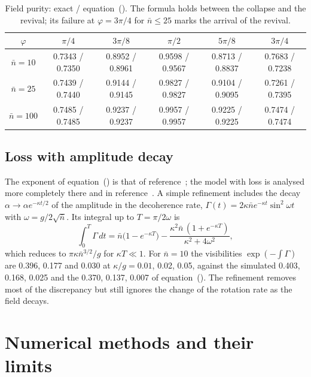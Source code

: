 \documentclass{iopjournal}
\newcommand{\nbar}{\bar{n}}
\begin{document}
\begin{table}
\centering
\caption{Field purity: exact / equation~(). The formula holds between the collapse and the revival; its failure at $\varphi = 3\pi/4$ for $\nbar\leq25$ marks the arrival of the revival.}
\begin{tabular}{cccccc}
\hline
$\varphi$ & $\pi/4$ & $3\pi/8$ & $\pi/2$ & $5\pi/8$ & $3\pi/4$ \\
\hline
$\nbar = 10$ & 0.7343 / 0.7350 & 0.8952 / 0.8961 & 0.9598 / 0.9567 & 0.8713 / 0.8837 & 0.7683 / 0.7238 \\
$\nbar = 25$ & 0.7439 / 0.7440 & 0.9144 / 0.9145 & 0.9827 / 0.9827 & 0.9104 / 0.9095 & 0.7261 / 0.7395 \\
$\nbar = 100$ & 0.7485 / 0.7485 & 0.9237 / 0.9237 & 0.9957 / 0.9957 & 0.9225 / 0.9225 & 0.7474 / 0.7474 \\
\hline
\end{tabular}
\label{tab:S-purity}
\end{table}

\subsection{Loss with amplitude decay}
The exponent of equation~() is that of reference~\cite{S-meunier2006}; the model with loss is analysed more completely there and in reference~\cite{S-gea1993}. A simple refinement includes the decay $\alpha\to\alpha e^{-\kappa t/2}$ of the amplitude in the decoherence rate, $\Gamma(t) = 2\kappa\nbar e^{-\kappa t}\sin^2\omega t$ with $\omega = g/2\sqrt{\nbar}$. Its integral up to $T = \pi/2\omega$ is
\begin{equation}
\int_0^T\Gamma\,dt = \nbar\big(1-e^{-\kappa T}\big) - \frac{\kappa^2\nbar\,(1+e^{-\kappa T})}{\kappa^2+4\omega^2},
\end{equation}
which reduces to $\pi\kappa\nbar^{3/2}/g$ for $\kappa T\ll1$. For $\nbar = 10$ the visibilities $\exp(-\int\Gamma)$ are 0.396, 0.177 and 0.030 at $\kappa/g = 0.01$, 0.02, 0.05, against the simulated 0.403, 0.168, 0.025 and the 0.370, 0.137, 0.007 of equation~(). The refinement removes most of the discrepancy but still ignores the change of the rotation rate as the field decays.

\section{Numerical methods and their limits}
\end{document}
